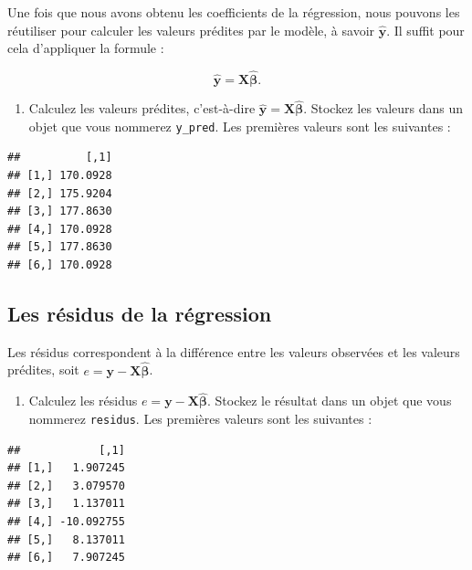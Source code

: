 \documentclass[
  11pt,
]{book}
\providecommand{\tightlist}{%
  \setlength{\itemsep}{0pt}\setlength{\parskip}{0pt}}
\numberwithin{equation}{section}
\numberwithin{countremarque}{section}
\newenvironment{greenbox}{
  \begin{tcolorbox}[breakable, colback=vert,coltext=black,
                  colframe=grisfonce]}
 {\end{tcolorbox}}
\begin{document}
Une fois que nous avons obtenu les coefficients de la régression, nous pouvons les réutiliser pour calculer les valeurs prédites par le modèle, à savoir \(\hat{\boldsymbol y}\). Il suffit pour cela d'appliquer la formule :

\[\hat{\boldsymbol y} = \boldsymbol X \boldsymbol{\hat{\beta}}.\]

\begin{greenbox}

\begin{enumerate}
\def\labelenumi{\arabic{enumi}.}
\setcounter{enumi}{12}
\tightlist
\item
  Calculez les valeurs prédites, c'est-à-dire \(\hat{\boldsymbol y} = \boldsymbol X \hat{\boldsymbol\beta}\). Stockez les valeurs dans un objet que vous nommerez \texttt{y\_pred}. Les premières valeurs sont les suivantes :
\end{enumerate}

\begin{lstlisting}
##          [,1]
## [1,] 170.0928
## [2,] 175.9204
## [3,] 177.8630
## [4,] 170.0928
## [5,] 177.8630
## [6,] 170.0928
\end{lstlisting}

\end{greenbox}

\hypertarget{les-ruxe9sidus-de-la-ruxe9gression}{%
\subsection{Les résidus de la régression}\label{les-ruxe9sidus-de-la-ruxe9gression}}

Les résidus correspondent à la différence entre les valeurs observées et les valeurs prédites, soit \(e = \boldsymbol y - \boldsymbol{X}\hat{\boldsymbol\beta}\).

\begin{greenbox}

\begin{enumerate}
\def\labelenumi{\arabic{enumi}.}
\setcounter{enumi}{13}
\tightlist
\item
  Calculez les résidus \(e = \boldsymbol y - \boldsymbol{X}\hat{\boldsymbol\beta}\). Stockez le résultat dans un objet que vous nommerez \texttt{residus}. Les premières valeurs sont les suivantes :
\end{enumerate}

\begin{lstlisting}
##            [,1]
## [1,]   1.907245
## [2,]   3.079570
## [3,]   1.137011
## [4,] -10.092755
## [5,]   8.137011
## [6,]   7.907245
\end{lstlisting}

\end{greenbox}
\end{document}
